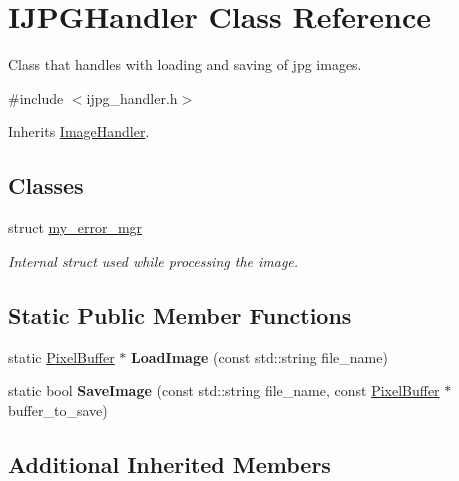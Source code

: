 \hypertarget{classIJPGHandler}{}\section{I\+J\+P\+G\+Handler Class Reference}
\label{classIJPGHandler}


Class that handles with loading and saving of jpg images.  




{\ttfamily \#include $<$ijpg\+\_\+handler.\+h$>$}



Inherits \hyperlink{classImageHandler}{Image\+Handler}.

\subsection*{Classes}
\begin{DoxyCompactItemize}
\item 
struct \hyperlink{structIJPGHandler_1_1my__error__mgr}{my\+\_\+error\+\_\+mgr}
\begin{DoxyCompactList}\small\item\em Internal struct used while processing the image. \end{DoxyCompactList}\end{DoxyCompactItemize}
\subsection*{Static Public Member Functions}
\begin{DoxyCompactItemize}
\item 
static \hyperlink{classimage__tools_1_1PixelBuffer}{Pixel\+Buffer} $\ast$ {\bfseries Load\+Image} (const std\+::string file\+\_\+name)\hypertarget{classIJPGHandler_a6c1b03049175a70451a36ad1a9db634e}{}\label{classIJPGHandler_a6c1b03049175a70451a36ad1a9db634e}

\item 
static bool {\bfseries Save\+Image} (const std\+::string file\+\_\+name, const \hyperlink{classimage__tools_1_1PixelBuffer}{Pixel\+Buffer} $\ast$buffer\+\_\+to\+\_\+save)\hypertarget{classIJPGHandler_a0250bf0243cc6b7a10eac09e30e0c52d}{}\label{classIJPGHandler_a0250bf0243cc6b7a10eac09e30e0c52d}

\end{DoxyCompactItemize}
\subsection*{Additional Inherited Members}


